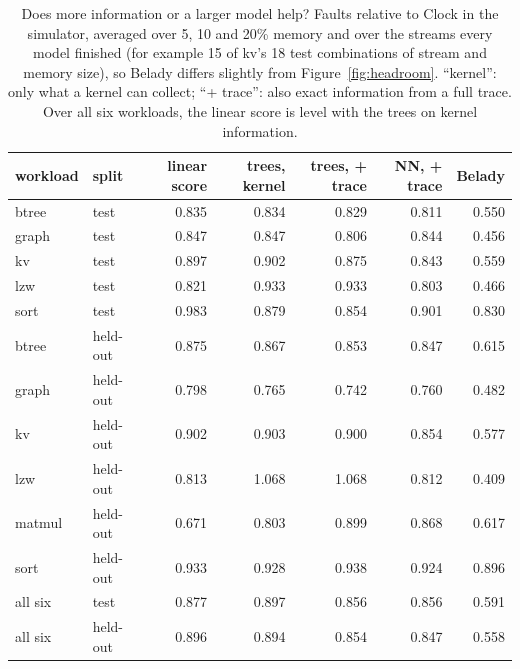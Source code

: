 \documentclass{article}
\newcommand{\clock}{Clock\xspace}
\newcommand{\belady}{Belady\xspace}
\newcommand{\wsixteen}{figures/data/w16}
\begin{document}
\begin{table}[h!]
\caption{Does more information or a larger model help? Faults relative to \clock in the simulator, averaged over 5, 10 and 20\% memory and over the streams every model finished (for example 15 of kv's 18 test combinations of stream and memory size), so \belady differs slightly from Figure~\ref{fig:headroom}. ``kernel'': only what a kernel can collect; ``+ trace'': also exact information from a full trace. Over all six workloads, the linear score is level with the trees on kernel information.}
\label{tab:info}
\vskip 0.05in
\begin{center}
\begin{footnotesize}
\setlength{\tabcolsep}{3pt}
\begin{tabular}{@{}llrrrrr@{}}
\toprule
workload & split & linear score & trees, kernel & trees, + trace & NN, + trace & \belady \\
\midrule
btree  & test & 0.835 & 0.834 & 0.829 & 0.811 & 0.550 \\
graph  & test & 0.847 & 0.847 & 0.806 & 0.844 & 0.456 \\
kv     & test & 0.897 & 0.902 & 0.875 & 0.843 & 0.559 \\
lzw    & test & 0.821 & 0.933 & 0.933 & 0.803 & 0.466 \\
sort   & test & 0.983 & 0.879 & 0.854 & 0.901 & 0.830 \\
\midrule
btree  & held-out & 0.875 & 0.867 & 0.853 & 0.847 & 0.615 \\
graph  & held-out & 0.798 & 0.765 & 0.742 & 0.760 & 0.482 \\
kv     & held-out & 0.902 & 0.903 & 0.900 & 0.854 & 0.577 \\
lzw    & held-out & 0.813 & 1.068 & 1.068 & 0.812 & 0.409 \\
matmul & held-out & 0.671 & 0.803 & 0.899 & 0.868 & 0.617 \\
sort   & held-out & 0.933 & 0.928 & 0.938 & 0.924 & 0.896 \\
\midrule
all six & test & 0.877 & 0.897 & 0.856 & 0.856 & 0.591 \\
all six & held-out & 0.896 & 0.894 & 0.854 & 0.847 & 0.558 \\
\bottomrule
\end{tabular}
\end{footnotesize}
\end{center}
\end{table}

\begin{table}[h!]
\caption{LeCaR in the simulator: faults relative to \clock on the streams of Table~\ref{tab:info}. ``As published'': LeCaR chooses between exact LRU and exact LFU, which needs every access. ``Kernel form'': it chooses between \clock and the kernel's frequency count, using only the accessed bit. Both use LeCaR's original settings (learning rate 0.45, a history half the size of memory per policy). ARC here sees every access.}
\label{tab:lecar}
\vskip 0.05in
\begin{center}
\end{center}
\end{table}
\end{document}
